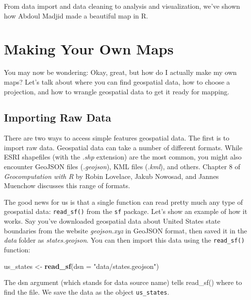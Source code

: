 \documentclass[
]{book}
\newenvironment{Shaded}{\begin{snugshade}}{\end{snugshade}}
\newcommand{\AttributeTok}[1]{\textcolor[rgb]{0.13,0.29,0.53}{#1}}
\newcommand{\FunctionTok}[1]{\textcolor[rgb]{0.13,0.29,0.53}{\textbf{#1}}}
\newcommand{\NormalTok}[1]{#1}
\newcommand{\OtherTok}[1]{\textcolor[rgb]{0.56,0.35,0.01}{#1}}
\newcommand{\StringTok}[1]{\textcolor[rgb]{0.31,0.60,0.02}{#1}}
\begin{document}
From data import and data cleaning to analysis and visualization, we've shown how Abdoul Madjid made a beautiful map in R.

\hypertarget{making-your-own-maps}{%
\section*{Making Your Own Maps}\label{making-your-own-maps}}

You may now be wondering: Okay, great, but how do I actually make my own maps? Let's talk about where you can find geospatial data, how to choose a projection, and how to wrangle geospatial data to get it ready for mapping.

\hypertarget{importing-raw-data}{%
\subsection*{Importing Raw Data}\label{importing-raw-data}}

There are two ways to access simple features geospatial data. The first is to import raw data. Geospatial data can take a number of different formats. While ESRI shapefiles (with the \emph{.shp} extension) are the most common, you might also encounter GeoJSON files (\emph{.geojson}), KML files (\emph{.kml}), and others. Chapter 8 of \emph{Geocomputation with R} by Robin Lovelace, Jakub Nowosad, and Jannes Muenchow discusses this range of formats.

The good news for us is that a single function can read pretty much any type of geospatial data: \texttt{read\_sf()} from the \texttt{sf} package. Let's show an example of how it works. Say you've downloaded geospatial data about United States state boundaries from the website \emph{geojson.xyz} in GeoJSON format, then saved it in the \emph{data} folder as \emph{states.geojson}. You can then import this data using the \texttt{read\_sf()} function:

\begin{Shaded}
\begin{Highlighting}[]
\NormalTok{us\_states }\OtherTok{\textless{}{-}} \FunctionTok{read\_sf}\NormalTok{(}\AttributeTok{dsn =} \StringTok{"data/states.geojson"}\NormalTok{)}
\end{Highlighting}
\end{Shaded}

The dsn argument (which stands for data source name) tells read\_sf() where to find the file. We save the data as the object \texttt{us\_states}.
\end{document}
